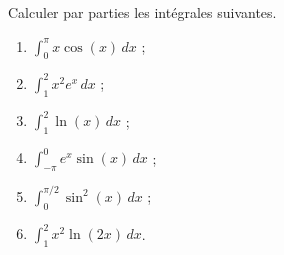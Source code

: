 
\begin{exercice}\label{exoTD5-a-0003}

Calculer par parties les intégrales suivantes.
\begin{enumerate}
\item $\displaystyle \int_0^\pi x\cos(x)\, dx $ ;
  \item $\displaystyle \int_1^2 x^{2}e^x \, dx $ ;
    \item $\displaystyle \int_1^2 \ln(x) \, dx $ ;
      \item $\displaystyle \int_{-\pi}^{0} e^x\sin(x) \, dx $ ;
        \item $\displaystyle \int_{0}^{\pi/2} \sin^2(x) \, dx$ ;
          \item $\displaystyle \int_{1}^{2} x^2\ln(2x) \, dx$.
\end{enumerate}

\end{exercice}
